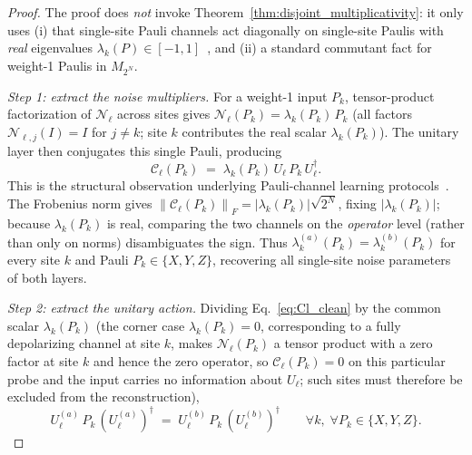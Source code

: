 \documentclass[%
 reprint,
superscriptaddress,
 amsmath,amssymb,
 aps,
]{revtex4-2}
\newcommand{\norm}[1]{\left\lVert#1\right\rVert}
\begin{document}
\begin{proof}
The proof does \emph{not} invoke Theorem~\ref{thm:disjoint_multiplicativity}: it only uses (i) that single-site Pauli channels act diagonally on single-site Paulis with \emph{real} eigenvalues $\lambda_k(P)\in[-1,1]$~\cite{nielsen2002simple,magesan2012characterizing,flammia2020pauli,harper2020efficient}, and (ii) a standard commutant fact for weight-1 Paulis in $M_{2^N}$.

\emph{Step 1: extract the noise multipliers.} For a weight-1 input $P_k$, tensor-product factorization of $\mathcal{N}_\ell$ across sites gives $\mathcal{N}_\ell(P_k) = \lambda_k(P_k)\,P_k$ (all factors $\mathcal{N}_{\ell,j}(I)=I$ for $j\ne k$; site $k$ contributes the real scalar $\lambda_k(P_k)$). The unitary layer then conjugates this single Pauli, producing
\begin{equation}
    \mathcal{C}_\ell(P_k) \;=\; \lambda_k(P_k)\,U_\ell\,P_k\,U_\ell^{\dagger}.
    \label{eq:Cl_clean}
\end{equation}
This is the structural observation underlying Pauli-channel learning protocols~\cite{flammia2020pauli,harper2020efficient}. The Frobenius norm gives $\norm{\mathcal{C}_\ell(P_k)}_F = |\lambda_k(P_k)|\sqrt{2^N}$, fixing $|\lambda_k(P_k)|$; because $\lambda_k(P_k)$ is real, comparing the two channels on the \emph{operator} level (rather than only on norms) disambiguates the sign. Thus $\lambda_k^{(a)}(P_k)=\lambda_k^{(b)}(P_k)$ for every site $k$ and Pauli $P_k\in\{X,Y,Z\}$, recovering all single-site noise parameters of both layers.

\emph{Step 2: extract the unitary action.} Dividing Eq.~\eqref{eq:Cl_clean} by the common scalar $\lambda_k(P_k)$ (the corner case $\lambda_k(P_k)=0$, corresponding to a fully depolarizing channel at site $k$, makes $\mathcal{N}_\ell(P_k)$ a tensor product with a zero factor at site $k$ and hence the zero operator, so $\mathcal{C}_\ell(P_k)=0$ on this particular probe and the input carries no information about $U_\ell$; such sites must therefore be excluded from the reconstruction),
\begin{equation}
    U_\ell^{(a)}\,P_k\,(U_\ell^{(a)})^{\dagger} \;=\; U_\ell^{(b)}\,P_k\,(U_\ell^{(b)})^{\dagger} \qquad \forall k,\; \forall P_k\in\{X,Y,Z\}.
    \label{eq:conjugate_equal}
\end{equation}


\end{proof}
\end{document}
